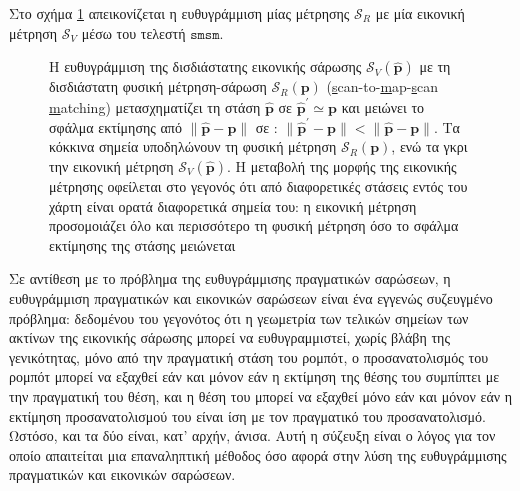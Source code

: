 Στο σχήμα \ref{fig:smsm_principle} απεικονίζεται η ευθυγράμμιση μίας μέτρησης
$\mathcal{S}_R$ με μία εικονική μέτρηση $\mathcal{S}_V$ μέσω του τελεστή
$\texttt{smsm}$.


\begin{figure}[htbp]\centering
  
  \vspace{0.5cm}
  \caption{\small Η ευθυγράμμιση της δισδιάστατης εικονικής σάρωσης
           $\mathcal{S}_V(\hat{\bm{p}})$ με τη δισδιάστατη φυσική μέτρηση-σάρωση
           $\mathcal{S}_R(\bm{p})$
           (\underline{s}can-to-\underline{m}ap-\underline{s}can
           \underline{m}atching) μετασχηματίζει τη στάση $\hat{\bm{p}}$ σε
           $\hat{\bm{p}}^\prime \simeq \bm{p}$ και μειώνει το σφάλμα εκτίμησης
           από $\|\hat{\bm{p}}-\bm{p}\|$ σε : $\|\hat{\bm{p}}^\prime -
           \bm{p}\| < \|\hat{\bm{p}}- \bm{p}\|$. Τα κόκκινα σημεία υποδηλώνουν
           τη φυσική μέτρηση $\mathcal{S}_R(\bm{p})$, ενώ τα γκρι την εικονική
           μέτρηση $\mathcal{S}_V(\hat{\bm{p}})$.  Η μεταβολή της μορφής της
           εικονικής μέτρησης οφείλεται στο γεγονός ότι από διαφορετικές
           στάσεις εντός του χάρτη είναι ορατά διαφορετικά σημεία του: η
           εικονική μέτρηση προσομοιάζει όλο και περισσότερο τη φυσική μέτρηση
           όσο το σφάλμα εκτίμησης της στάσης μειώνεται}
  \label{fig:smsm_principle}
\end{figure}

\begin{gg_box}
\begin{remark}
\label{rem:iterative}
Σε αντίθεση με το πρόβλημα της ευθυγράμμισης πραγματικών σαρώσεων, η
ευθυγράμμιση πραγματικών και εικονικών σαρώσεων είναι ένα εγγενώς συζευγμένο
πρόβλημα: δεδομένου του γεγονότος ότι η γεωμετρία των τελικών σημείων των
ακτίνων της εικονικής σάρωσης μπορεί να ευθυγραμμιστεί, χωρίς βλάβη της
γενικότητας, μόνο από την πραγματική στάση του ρομπότ, ο προσανατολισμός του
ρομπότ μπορεί να εξαχθεί εάν και μόνον εάν η εκτίμηση της θέσης του συμπίπτει
με την πραγματική του θέση, και η θέση του μπορεί να εξαχθεί μόνο εάν και
μόνον εάν η εκτίμηση προσανατολισμού του είναι ίση με τον πραγματικό του
προσανατολισμό. Ωστόσο, και τα δύο είναι, κατ' αρχήν, άνισα. Αυτή η σύζευξη
είναι ο λόγος για τον οποίο απαιτείται μια επαναληπτική μέθοδος όσο αφορά
στην λύση της ευθυγράμμισης πραγματικών και εικονικών σαρώσεων.
\end{remark}
\end{gg_box}

